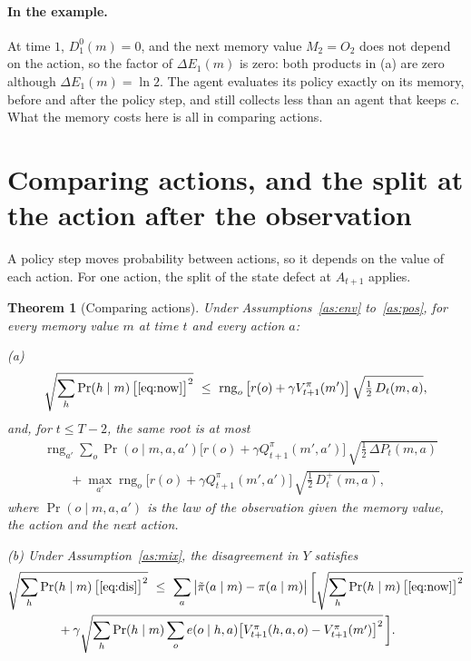 \documentclass{article}
\newtheorem{theorem}{Theorem}
\theoremstyle{definition}
\newcommand{\dE}{\Delta E}
\newcommand{\dP}{\Delta P}
\newcommand{\rng}{\operatorname{rng}}
\begin{document}
\paragraph{In the example.} At time $1$, $D^0_1(m)=0$, and the next memory value $M_2=O_2$ does not depend on the action, so the factor of $\dE_1(m)$ is zero: both products in (a) are zero although $\dE_1(m)=\ln2$. The agent evaluates its policy exactly on its memory, before and after the policy step, and still collects less than an agent that keeps $c$. What the memory costs here is all in comparing actions.

\section{Comparing actions, and the split at the action after the observation}\label{sec:actions}

A policy step moves probability between actions, so it depends on the value of each action. For one action, the split of the state defect at $A_{t+1}$ applies.

\begin{theorem}[Comparing actions]\label{thm:actions}
Under Assumptions~\ref{as:env} to~\ref{as:pos}, for every memory value $m$ at time $t$ and every action $a$:

(a)
\[
\sqrt{\sum_h\Pr(h\mid m)\,\big[\eqref{eq:now}\big]^2}\ \le\ \rng_o\big[r(o)+\gamma V^\pi_{t+1}(m')\big]\,\sqrt{\tfrac12\,D_t(m,a)},
\]
and, for $t\le T-2$, the same root is at most
\begin{align*}
&\rng_{a'}\sum_o\Pr(o\mid m,a,a')\big[r(o)+\gamma Q^\pi_{t+1}(m',a')\big]\,\sqrt{\tfrac12\,\dP_t(m,a)}\\
&\qquad+\max_{a'}\rng_o\big[r(o)+\gamma Q^\pi_{t+1}(m',a')\big]\,\sqrt{\tfrac12\,D^+_t(m,a)},
\end{align*}
where $\Pr(o\mid m,a,a')$ is the law of the observation given the memory value, the action and the next action.

(b) Under Assumption~\ref{as:mix}, the disagreement in $Y$ satisfies
\begin{align*}
&\sqrt{\sum_h\Pr(h\mid m)\,\big[\eqref{eq:dis}\big]^2}\ \le\ \sum_a\big|\tilde\pi(a\mid m)-\pi(a\mid m)\big|\,\bigg[\sqrt{\sum_h\Pr(h\mid m)\,\big[\eqref{eq:now}\big]^2}\\
&\qquad\qquad+\gamma\sqrt{\sum_h\Pr(h\mid m)\sum_oe(o\mid h,a)\big[V^\pi_{t+1}(h,a,o)-V^\pi_{t+1}(m')\big]^2}\,\bigg].
\end{align*}
\end{theorem}
\end{document}

